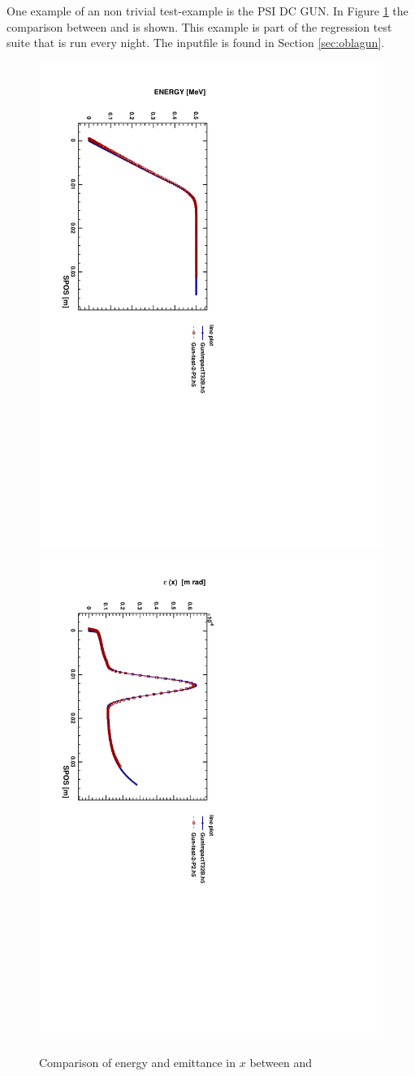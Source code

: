 One example of an non trivial test-example is the PSI DC GUN. In Figure \ref{fig:guncomp1} the comparison between \impactt and \opalt is shown. This example is part of the regression test suite
that is run every night. The inputfile is found in Section \ref{sec:oblagun}.  
\begin{figure}[ht]
 \begin{center} 
   \includegraphics[width=0.60\linewidth,angle=90]{figures/Gun/GunCompEn}
   \includegraphics[width=0.60\linewidth,angle=90]{figures/Gun/GunCompEx}
   \caption{Comparison of energy and emittance in $x$ between \impactt and \opalt}   
   \label{fig:guncomp1}
 \end{center}
\end{figure}

